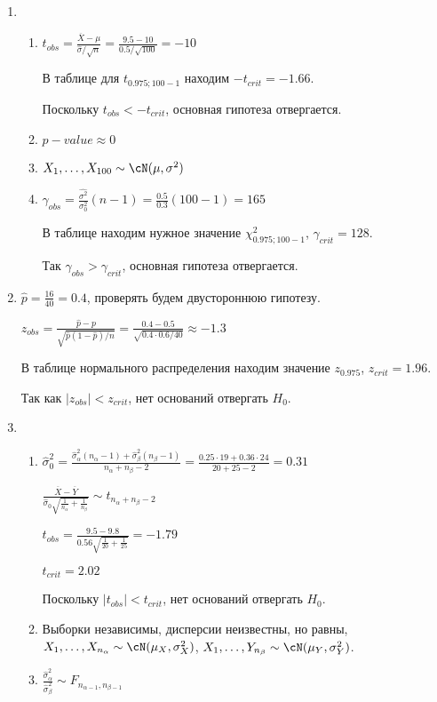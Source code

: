 \begin{enumerate}
\item
\begin{enumerate}
\item $t_{obs} = \frac{\overline X - \mu}{\hat\sigma/\sqrt{n}} = \frac{9.5-10}{0.5/\sqrt{100}} = -10$

В таблице для $t_{0.975;100-1}$ находим $-t_{crit} = -1.66$.

Поскольку $t_{obs} < -t_{crit}$, основная гипотеза отвергается.
\item $p-value \approx 0$
\item $X_1, \ldots, X_{100} \sim \cN(\mu, \sigma^2)$
\item $\gamma_{obs} = \frac{\hat{\sigma^2}}{\sigma^2_0}(n-1) = \frac{0.5}{0.3}(100-1) = 165$

В таблице находим нужное значение $\chi^2_{0.975;100-1}$, $\gamma_{crit} = 128$.

Так $\gamma_{obs} > \gamma_{crit}$, основная гипотеза отвергается.
\end{enumerate}
\item $\hat{p} = \frac{16}{40} = 0.4$, проверять будем двустороннюю гипотезу.

$z_{obs} = \frac{\hat{p} - p}{\sqrt{\hat{p}(1-\hat{p})/n}} = \frac{0.4-0.5}{\sqrt{0.4\cdot0.6/40}} \approx -1.3$

В таблице нормального распределения находим значение $z_{0.975}$, $z_{crit} = 1.96$.

Так как $\vert z_{obs} \vert < z_{crit}$, нет оснований отвергать $H_0$.
\item
\begin{enumerate}
\item $\hat{\sigma}_0^2 = \frac{\hat{\sigma}_\alpha^2(n_\alpha -1) + \hat{\sigma}_\beta^2(n_\beta-1)}{n_\alpha+n_\beta-2} = \frac{0.25\cdot19 + 0.36\cdot24}{20+25-2}=0.31$

$\frac{\overline{X} - \overline{Y}}{\hat{\sigma}_0 \sqrt{\frac{1}{n_\alpha}+\frac{1}{n_\beta}}} \sim t_{n_\alpha+n_\beta-2}$

$t_{obs} = \frac{9.5-9.8}{0.56\sqrt{\frac{1}{20}+ \frac{1}{25}}} = -1.79$

$t_{crit} = 2.02$

Поскольку $\vert t_{obs} \vert < t_{crit}$, нет оснований отвергать $H_0$.
\item Выборки независимы, дисперсии неизвестны, но равны,
$X_1, \ldots, X_{n_\alpha} \sim \cN(\mu_X, \sigma^2_X)$,
$X_1, \ldots, Y_{n_\beta} \sim \cN(\mu_Y, \sigma^2_Y)$.
\item $\frac{\hat{\sigma}_\alpha^2}{\hat{\sigma}_\beta^2} \sim F_{n_{\alpha-1}, n_{\beta-1}}$


\end{enumerate}
\end{enumerate}
